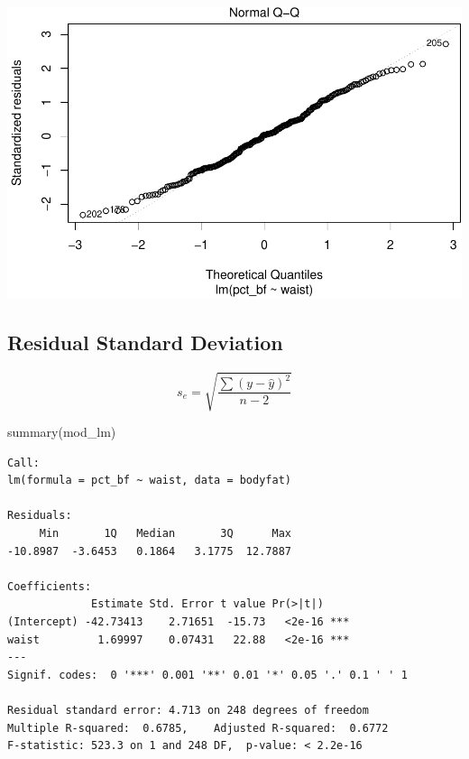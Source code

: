 \documentclass[
]{article}
\newenvironment{Shaded}{\begin{snugshade}}{\end{snugshade}}
\newcommand{\FunctionTok}[1]{\textcolor[rgb]{0.00,0.00,0.00}{#1}}
\newcommand{\NormalTok}[1]{#1}
\newcommand{\OtherTok}[1]{\textcolor[rgb]{0.56,0.35,0.01}{#1}}
\newcommand{\SpecialCharTok}[1]{\textcolor[rgb]{0.00,0.00,0.00}{#1}}
\begin{document}
\begin{center}\includegraphics{CHAP23_files/figure-latex/unnamed-chunk-6-2} \end{center}

\hypertarget{residual-standard-deviation}{%
\subsection{Residual Standard Deviation}\label{residual-standard-deviation}}

\[s_{e} = \sqrt{\frac{\sum(y - \hat{y})^2}{n-2}}\]

\begin{Shaded}
\begin{Highlighting}[]
\FunctionTok{summary}\NormalTok{(mod\_lm)}
\end{Highlighting}
\end{Shaded}

\begin{verbatim}
Call:
lm(formula = pct_bf ~ waist, data = bodyfat)

Residuals:
     Min       1Q   Median       3Q      Max 
-10.8987  -3.6453   0.1864   3.1775  12.7887 

Coefficients:
             Estimate Std. Error t value Pr(>|t|)    
(Intercept) -42.73413    2.71651  -15.73   <2e-16 ***
waist         1.69997    0.07431   22.88   <2e-16 ***
---
Signif. codes:  0 '***' 0.001 '**' 0.01 '*' 0.05 '.' 0.1 ' ' 1

Residual standard error: 4.713 on 248 degrees of freedom
Multiple R-squared:  0.6785,    Adjusted R-squared:  0.6772 
F-statistic: 523.3 on 1 and 248 DF,  p-value: < 2.2e-16
\end{verbatim}

\begin{Shaded}
\end{Shaded}
\end{document}
